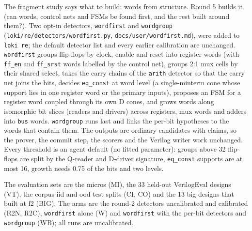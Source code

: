 \documentclass[conference]{IEEEtran}
\newcommand{\code}[1]{\texttt{#1}}
\begin{document}
The fragment study says what to build: words from structure. Round 5 builds it (can words, control nets and FSMs be found first, and the rest built around them?). Two opt-in
detectors, \code{wordfirst} and \code{wordgroup} (\code{loki/re/detectors/wordfirst.py},
\code{docs/user/wordfirst.md}), were added to \code{loki re}; the default detector list and every
earlier calibration are unchanged. \code{wordfirst} groups flip-flops by clock, enable and reset
into register words (with \code{ff\_en} and \code{ff\_srst} words labelled by the control net),
groups 2:1 mux cells by their shared select, takes the carry chains of the \code{arith} detector
so that the carry net joins the bits, decides \code{eq\_const} at word level (a single-minterm
cone whose support lies in one register word or the primary inputs), proposes an FSM for a
register word coupled through its own D cones, and grows words along isomorphic bit slices
(readers and drivers) across registers, mux words and adders into \code{bus} words.
\code{wordgroup} runs last and links the per-bit hypotheses to the words that contain them. The
outputs are ordinary candidates with claims, so the prover, the commit step, the scorers and the
Verilog writer work unchanged. Every threshold is an agent default (no fitted parameter): groups
above 32 flip-flops are split by the Q-reader and D-driver signature, \code{eq\_const} supports
are at most 16, growth needs 0.75 of the bits and two levels.

The evaluation sets are the micros (MI), the
33 held-out VerilogEval designs (VT), the corpus iid and ood test splits (CI, CO) and the 13 big
designs that built at f2 (BIG). The arms are the round-2 detectors uncalibrated and calibrated
(R2N, R2C), \code{wordfirst} alone (W) and \code{wordfirst} with the per-bit detectors and
\code{wordgroup} (WB); all runs are uncalibrated. 



\end{document}
